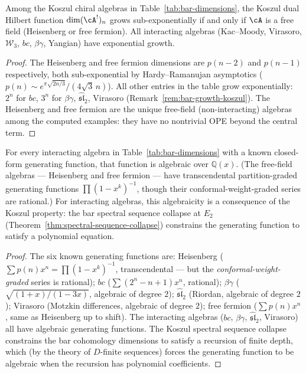 \begin{corollary}
\label{cor:subexp-free-field}
Among the Koszul chiral algebras in Table~\textup{\ref{tab:bar-dimensions}}, the Koszul dual Hilbert function $\dim (\cA^!)_n$ grows sub-exponentially if and only if $\cA$ is a free field (Heisenberg or free fermion).  All interacting algebras (Kac--Moody, Virasoro, $\mathcal{W}_3$, $bc$, $\beta\gamma$, Yangian) have exponential growth.
\end{corollary}

\begin{proof}
The Heisenberg and free fermion dimensions are $p(n-2)$ and $p(n-1)$ respectively, both sub-exponential by Hardy--Ramanujan asymptotics ($p(n) \sim e^{\pi\sqrt{2n/3}}/(4\sqrt{3}\,n)$).  All other entries in the table grow exponentially: $2^n$ for $bc$, $3^n$ for $\beta\gamma$, $\widehat{\mathfrak{sl}}_2$, Virasoro (Remark~\ref{rem:bar-growth-koszul}).  The Heisenberg and free fermion are the unique free-field (non-interacting) algebras among the computed examples: they have no nontrivial OPE beyond the central term.
\end{proof}

\begin{corollary}
\label{cor:algebraicity-koszul}
For every interacting algebra in Table~\textup{\ref{tab:bar-dimensions}} with a known closed-form generating function, that function is algebraic over $\mathbb{Q}(x)$.  (The free-field algebras --- Heisenberg and free fermion --- have transcendental partition-graded generating functions $\prod(1-x^k)^{-1}$, though their conformal-weight-graded series are rational.)  For interacting algebras, this algebraicity is a consequence of the Koszul property: the bar spectral sequence collapse at $E_2$ (Theorem~\ref{thm:spectral-sequence-collapse}) constrains the generating function to satisfy a polynomial equation.
\end{corollary}

\begin{proof}
The six known generating functions are:
Heisenberg ($\sum p(n) x^n = \prod(1-x^k)^{-1}$, transcendental --- but the \emph{conformal-weight-graded} series is rational);
$bc$ ($\sum (2^n - n + 1) x^n$, rational);
$\beta\gamma$ ($\sqrt{(1+x)/(1-3x)}$, algebraic of degree $2$);
$\widehat{\mathfrak{sl}}_2$ (Riordan, algebraic of degree $2$);
Virasoro (Motzkin differences, algebraic of degree $2$);
free fermion ($\sum p(n) x^n$, same as Heisenberg up to shift).
The interacting algebras ($bc$, $\beta\gamma$, $\widehat{\mathfrak{sl}}_2$, Virasoro) all have algebraic generating functions.  The Koszul spectral sequence collapse constrains the bar cohomology dimensions to satisfy a recursion of finite depth, which (by the theory of $D$-finite sequences) forces the generating function to be algebraic when the recursion has polynomial coefficients.
\end{proof}

